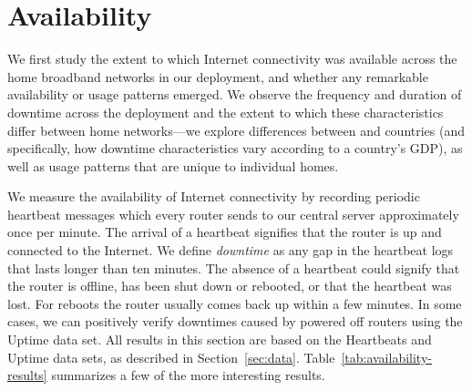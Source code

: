 \section{Availability}\label{sec:availability}


We first study the extent to which Internet connectivity was available across
the home broadband networks in our deployment, and whether any remarkable
availability or usage patterns emerged.  We observe the frequency and duration
of downtime across the deployment and the extent to which these characteristics
differ between home networks---we explore differences between
\developing{} and \developed{} countries (and specifically, how downtime
characteristics vary according to a country's GDP), as well as usage
patterns that are unique to individual homes.

We measure the availability of
Internet connectivity by recording periodic heartbeat messages
which every router sends to our central server approximately once per minute. The
arrival of a heartbeat signifies that the router is up and connected to
the Internet.  We define {\em downtime} as any gap in the heartbeat
logs that lasts longer than ten minutes.  The absence of a heartbeat
could signify that the router is offline, has been shut down or
rebooted, or that the heartbeat was lost.  For reboots the
router usually comes back up within a few minutes. In some cases, we can
positively verify downtimes caused by powered off routers using the Uptime data set. All results in
this section are based on the Heartbeats and Uptime data sets, as described in
Section~\ref{sec:data}.  Table~\ref{tab:availability-results} summarizes
a few of the more interesting results.


